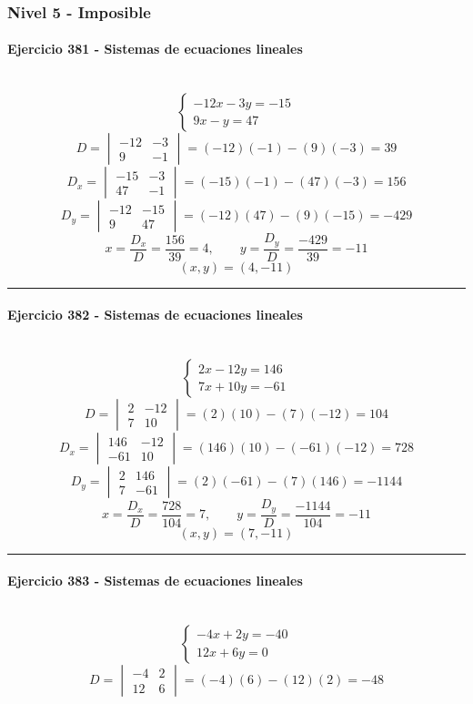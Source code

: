\documentclass[10pt,a4paper]{article}
\newcommand{\res}[1]{\paragraph{#1}\mbox{}\\[-1.2em]}
\begin{document}
\subsubsection*{Nivel 5 - Imposible}
\res{Ejercicio 381 - Sistemas de ecuaciones lineales}
\[ \begin{cases}- 12 x - 3 y=-15\\9 x - y=47\end{cases} \]
\[ D=\begin{vmatrix}-12&-3\\9&-1\end{vmatrix}=(-12)(-1)-(9)(-3)=39 \]
\[ D_x=\begin{vmatrix}-15&-3\\47&-1\end{vmatrix}=(-15)(-1)-(47)(-3)=156 \]
\[ D_y=\begin{vmatrix}-12&-15\\9&47\end{vmatrix}=(-12)(47)-(9)(-15)=-429 \]
\[ x=\frac{D_x}{D}=\frac{156}{39}=4,\qquad y=\frac{D_y}{D}=\frac{-429}{39}=-11 \]
\[ \boxed{(x,y)=(4,-11)} \]
\vspace{1mm}\hrule\vspace{2mm}
\res{Ejercicio 382 - Sistemas de ecuaciones lineales}
\[ \begin{cases}2 x - 12 y=146\\7 x + 10 y=-61\end{cases} \]
\[ D=\begin{vmatrix}2&-12\\7&10\end{vmatrix}=(2)(10)-(7)(-12)=104 \]
\[ D_x=\begin{vmatrix}146&-12\\-61&10\end{vmatrix}=(146)(10)-(-61)(-12)=728 \]
\[ D_y=\begin{vmatrix}2&146\\7&-61\end{vmatrix}=(2)(-61)-(7)(146)=-1144 \]
\[ x=\frac{D_x}{D}=\frac{728}{104}=7,\qquad y=\frac{D_y}{D}=\frac{-1144}{104}=-11 \]
\[ \boxed{(x,y)=(7,-11)} \]
\vspace{1mm}\hrule\vspace{2mm}
\res{Ejercicio 383 - Sistemas de ecuaciones lineales}
\[ \begin{cases}- 4 x + 2 y=-40\\12 x + 6 y=0\end{cases} \]
\[ D=\begin{vmatrix}-4&2\\12&6\end{vmatrix}=(-4)(6)-(12)(2)=-48 \]
\end{document}
